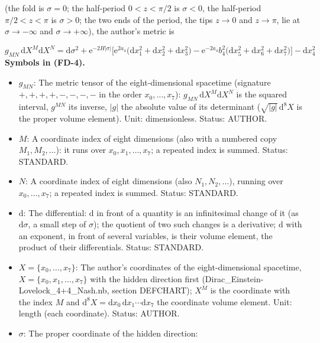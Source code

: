 \documentclass[
  10pt,
]{article}
\providecommand{\tightlist}{%
  \setlength{\itemsep}{0pt}\setlength{\parskip}{0pt}}
\begin{document}
(the fold is \(\sigma = 0\); the half-period \(0 < z < \pi/2\) is
\(\sigma < 0\), the half-period \(\pi/2 < z < \pi\) is \(\sigma > 0\);
the two ends of the period, the tips \(z \to 0\) and \(z \to \pi\), lie
at \(\sigma \to -\infty\) and \(\sigma \to +\infty\)), the author's
metric is

\[
g_{MN}\,\mathrm{d}X^M\mathrm{d}X^N = \mathrm{d}\sigma^2 + \mathrm{e}^{-2H\lvert\sigma\rvert}\Big[\mathrm{e}^{2a_4}\big(\mathrm{d}x_1^2
 + \mathrm{d}x_2^2 + \mathrm{d}x_3^2\big) - \mathrm{e}^{-2a_4}b_4^2\big(\mathrm{d}x_5^2 + \mathrm{d}x_6^2 + \mathrm{d}x_7^2\big)\Big]
 - \mathrm{d}x_4^2 \tag{FD-4}
\] \textbf{Symbols in (FD-4).}

\begin{itemize}
\tightlist
\item
  \(g_{MN}\): The metric tensor of the eight-dimensional spacetime
  (signature \(+,+,+,+,-,-,-,-\) in the order \(x_0, \dots, x_7\)):
  \(g_{MN}\,\mathrm{d}X^M\mathrm{d}X^N\) is the squared interval,
  \(g^{MN}\) its inverse, \(\lvert g\rvert\) the absolute value of its
  determinant (\(\sqrt{\lvert g\rvert}\,\mathrm{d}^8X\) is the proper
  volume element). Unit: dimensionless. Status: AUTHOR.
\item
  \(M\): A coordinate index of eight dimensions (also with a numbered
  copy \(M_1, M_2, \dots\)): it runs over \(x_0, x_1, \dots, x_7\); a
  repeated index is summed. Status: STANDARD.
\item
  \(N\): A coordinate index of eight dimensions (also
  \(N_1, N_2, \dots\)), running over \(x_0, \dots, x_7\); a repeated
  index is summed. Status: STANDARD.
\item
  \(\mathrm{d}\): The differential: \(\mathrm{d}\) in front of a
  quantity is an infinitesimal change of it (as \(\mathrm{d}\sigma\), a
  small step of \(\sigma\)); the quotient of two such changes is a
  derivative; \(\mathrm{d}\) with an exponent, in front of several
  variables, is their volume element, the product of their
  differentials. Status: STANDARD.
\item
  \(X = \{x_0, \dots, x_7\}\): The author's coordinates of the
  eight-dimensional spacetime, \(X = \{x_0, x_1, \dots, x_7\}\) with the
  hidden direction first (Dirac\_Einstein-Lovelock\_4+4\_Nash.nb,
  section DEFCHART); \(X^M\) is the coordinate with the index \(M\) and
  \(\mathrm{d}^8X = \mathrm{d}x_0\,\mathrm{d}x_1\cdots\mathrm{d}x_7\)
  the coordinate volume element. Unit: length (each coordinate). Status:
  AUTHOR.
\item
  \(\sigma\): The proper coordinate of the hidden direction:

\end{itemize}
\end{document}
